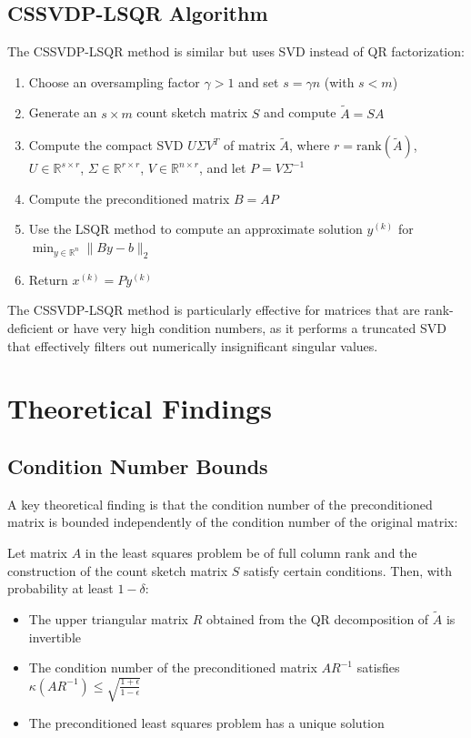 \documentclass[11pt]{article}
\begin{document}
\subsection{CSSVDP-LSQR Algorithm}

The CSSVDP-LSQR method is similar but uses SVD instead of QR factorization:

\begin{enumerate}
    \item Choose an oversampling factor $\gamma > 1$ and set $s = \gamma n$ (with $s < m$)
    \item Generate an $s \times m$ count sketch matrix $S$ and compute $\tilde{A} = SA$
    \item Compute the compact SVD $U\Sigma V^T$ of matrix $\tilde{A}$, where $r = \text{rank}(\tilde{A})$, $U \in \mathbb{R}^{s \times r}$, $\Sigma \in \mathbb{R}^{r \times r}$, $V \in \mathbb{R}^{n \times r}$, and let $P = V\Sigma^{-1}$
    \item Compute the preconditioned matrix $B = AP$
    \item Use the LSQR method to compute an approximate solution $y^{(k)}$ for $\min_{y \in \mathbb{R}^n} \|By - b\|_2$
    \item Return $x^{(k)} = Py^{(k)}$
\end{enumerate}

The CSSVDP-LSQR method is particularly effective for matrices that are rank-deficient or have very high condition numbers, as it performs a truncated SVD that effectively filters out numerically insignificant singular values.

\section{Theoretical Findings}

\subsection{Condition Number Bounds}

A key theoretical finding is that the condition number of the preconditioned matrix is bounded independently of the condition number of the original matrix:

\begin{theorem}
Let matrix $A$ in the least squares problem be of full column rank and the construction of the count sketch matrix $S$ satisfy certain conditions. Then, with probability at least $1-\delta$:
\begin{itemize}
    \item The upper triangular matrix $R$ obtained from the QR decomposition of $\tilde{A}$ is invertible
    \item The condition number of the preconditioned matrix $AR^{-1}$ satisfies $\kappa(AR^{-1}) \leq \sqrt{\frac{1+\epsilon}{1-\epsilon}}$
    \item The preconditioned least squares problem has a unique solution
\end{itemize}
\end{theorem}
\end{document}
